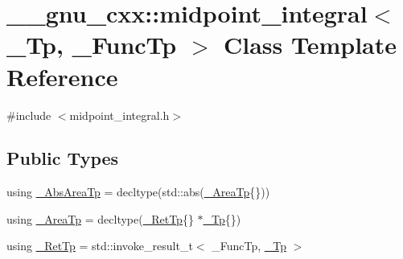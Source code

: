 \hypertarget{class____gnu__cxx_1_1midpoint__integral}{}\section{\+\_\+\+\_\+gnu\+\_\+cxx\+:\+:midpoint\+\_\+integral$<$ \+\_\+\+Tp, \+\_\+\+Func\+Tp $>$ Class Template Reference}
\label{class____gnu__cxx_1_1midpoint__integral}


{\ttfamily \#include $<$midpoint\+\_\+integral.\+h$>$}

\subsection*{Public Types}
\begin{DoxyCompactItemize}
\item 
using \hyperlink{class____gnu__cxx_1_1midpoint__integral_ae4c2b0cff4d7385e5c046ec4400bc69e}{\+\_\+\+Abs\+Area\+Tp} = decltype(std\+::abs(\hyperlink{class____gnu__cxx_1_1midpoint__integral_a43cd31237c2257dd657a2a84fd33dd69}{\+\_\+\+Area\+Tp}\{\}))
\item 
using \hyperlink{class____gnu__cxx_1_1midpoint__integral_a43cd31237c2257dd657a2a84fd33dd69}{\+\_\+\+Area\+Tp} = decltype(\hyperlink{class____gnu__cxx_1_1midpoint__integral_a9d6b6a3d38d137c3cc9f832a4f5da59f}{\+\_\+\+Ret\+Tp}\{\} $\ast$\hyperlink{namespace____gnu__cxx_a3b19a9c800ca194374ef9172290f7d79}{\+\_\+\+Tp}\{\})
\item 
using \hyperlink{class____gnu__cxx_1_1midpoint__integral_a9d6b6a3d38d137c3cc9f832a4f5da59f}{\+\_\+\+Ret\+Tp} = std\+::invoke\+\_\+result\+\_\+t$<$ \+\_\+\+Func\+Tp, \hyperlink{namespace____gnu__cxx_a3b19a9c800ca194374ef9172290f7d79}{\+\_\+\+Tp} $>$
\end{DoxyCompactItemize}
